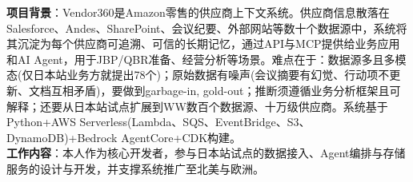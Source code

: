 \documentclass{resume}
\begin{document}
\begin{onehalfspacing}
\textbf{项目背景}：Vendor360是Amazon零售的供应商上下文系统。供应商信息散落在Salesforce、Andes、SharePoint、会议纪要、外部网站等数十个数据源中，系统将其沉淀为每个供应商可追溯、可信的长期记忆，通过API与MCP提供给业务应用和AI Agent，用于JBP/QBR准备、经营分析等场景。难点在于：数据源多且多模态(仅日本站业务方就提出78个)；原始数据有噪声(会议摘要有幻觉、行动项不更新、文档互相矛盾)，要做到garbage-in, gold-out；推断须遵循业务分析框架且可解释；还要从日本站试点扩展到WW数百个数据源、十万级供应商。系统基于Python+AWS Serverless(Lambda、SQS、EventBridge、S3、DynamoDB)+Bedrock AgentCore+CDK构建。\\

\textbf{工作内容}：本人作为核心开发者，参与日本站试点的数据接入、Agent编排与存储服务的设计与开发，并支撑系统推广至北美与欧洲。\\


\end{onehalfspacing}
\end{document}
